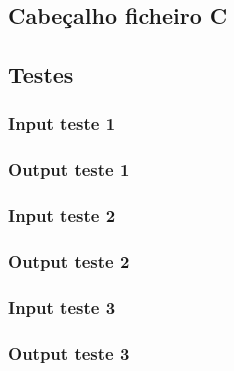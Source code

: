 \subsection{Cabeçalho ficheiro C}
\label{seq:anex-music-header}


\subsection{Testes}
\label{seq:anex-music-tests}
\subsubsection{Input teste 1}
\label{seq:anex-music-test-in01}


\subsubsection{Output teste 1}
\label{seq:anex-music-test-out01}


\subsubsection{Input teste 2}
\label{seq:anex-music-test-in02}


\subsubsection{Output teste 2}
\label{seq:anex-music-test-out02}


\subsubsection{Input teste 3}
\label{seq:anex-music-test-in03}


\subsubsection{Output teste 3}
\label{seq:anex-music-test-out03}


